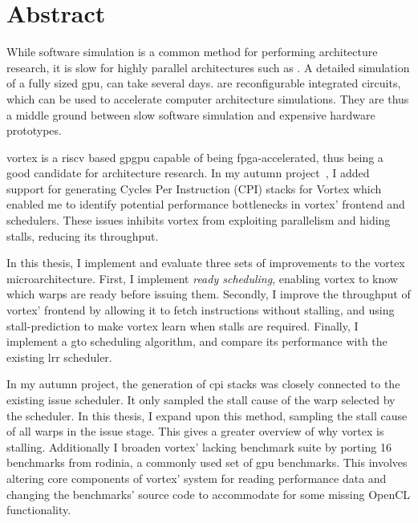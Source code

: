 \chapter*{Abstract}

While software simulation is a common method for performing architecture research, it is slow for highly parallel architectures such as . A detailed simulation of a fully sized \acrshort{gpu}, can take several days.  are reconfigurable integrated circuits, which can be used to accelerate computer architecture simulations. They are thus a middle ground between slow software simulation and expensive hardware prototypes.

\Gls{vortex} is a \Gls{riscv} based \acrshort{gpgpu} capable of being \acrshort{fpga}-accelerated, thus being a good candidate for architecture research. In my autumn project~\cite{Aurud_Project}, I added support for generating Cycles Per Instruction (CPI) stacks for Vortex which enabled me to identify potential performance bottlenecks in \Gls{vortex}' frontend and schedulers. These issues inhibits \Gls{vortex} from exploiting parallelism and hiding stalls, reducing its throughput.

In this thesis, I implement and evaluate three sets of improvements to the \Gls{vortex} microarchitecture. First, I implement \textit{ready scheduling}, enabling \Gls{vortex} to know which warps are ready before issuing them. Secondly, I improve the throughput of \Gls{vortex}' frontend by allowing it to fetch instructions without stalling, and using stall-prediction to make \Gls{vortex} learn when stalls are required. Finally, I implement a \acrfull{gto} scheduling algorithm, and compare its performance with the existing \acrfull{lrr} scheduler.

In my autumn project, the generation of \acrshort{cpi} stacks was closely connected to the existing issue scheduler. It only sampled the stall cause of the warp selected by the scheduler. In this thesis, I expand upon this method, sampling the stall cause of all warps in the issue stage. This gives a greater overview of why \Gls{vortex} is stalling. Additionally I broaden \Gls{vortex}' lacking benchmark suite by porting 16 benchmarks from \Gls{rodinia}, a commonly used set of \acrshort{gpu} benchmarks. This involves altering core components of \Gls{vortex}' system for reading performance data and changing the benchmarks' source code to accommodate for some missing OpenCL functionality. 

